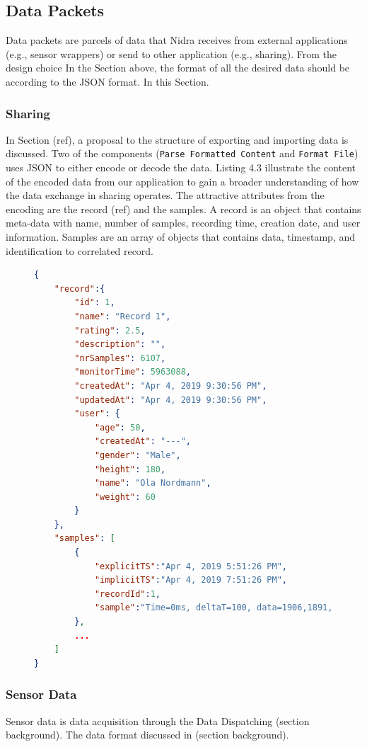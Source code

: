 \begin{table}
\begin{center}
\caption{Example entry in record table}
\end{center}
\end{table}

\subsection{Data Packets}
Data packets are parcels of data that Nidra receives from external applications (e.g., sensor wrappers) or send to other application (e.g., sharing). From the design choice In the Section above, the format of all the desired data should be according to the JSON format.  In this Section.

\subsubsection{Sharing}

In Section (ref), a proposal to the structure of exporting and importing data is discussed. Two of the components (\verb|Parse Formatted Content| and \verb|Format File|) uses JSON to either encode or decode the data. Listing 4.3 illustrate the content of the encoded data from our application to gain a broader understanding of how the data exchange in sharing operates. The attractive attributes from the encoding are the record (ref) and the samples.  A record is an object that contains meta-data with name, number of samples, recording time, creation date, and user information. Samples are an array of objects that contains data, timestamp, and identification to correlated record. 

\begin{figure}
    
\begin{lstlisting}[language=json, caption={My Caption}, captionpos=b]
{
    "record":{  
        "id": 1,
        "name": "Record 1",
        "rating": 2.5,
        "description": "",
        "nrSamples": 6107,
        "monitorTime": 5963088,
        "createdAt": "Apr 4, 2019 9:30:56 PM",
        "updatedAt": "Apr 4, 2019 9:30:56 PM",
        "user": {  
            "age": 50,
            "createdAt": "---",
            "gender": "Male",
            "height": 180,
            "name": "Ola Nordmann",
            "weight": 60
        }
    },
    "samples": [  
        {  
            "explicitTS":"Apr 4, 2019 5:51:26 PM",
            "implicitTS":"Apr 4, 2019 7:51:26 PM",
            "recordId":1,
            "sample":"Time=0ms, deltaT=100, data=1906,1891,1884,1881,1876,1718,1690"
        },
        ...
    ]
}
\end{lstlisting}
\end{figure}

\subsubsection{Sensor Data}
Sensor data is data acquisition through the Data Dispatching (section background). The data format discussed in (section background). 
